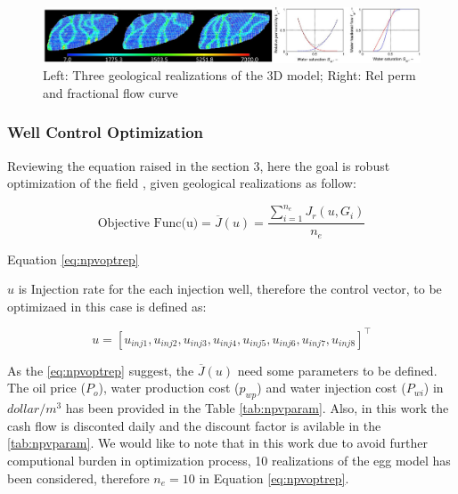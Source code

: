 \documentclass[]{elsarticle} %
\begin{document}
\begin{figure}

{\centering \includegraphics[width=1\linewidth]{img/combine} 

}

\caption{Left: Three geological realizations of the 3D model; Right: Rel perm and fractional flow curve}\label{fig:combine}
\end{figure}

\hypertarget{well-control-optimization}{%
\subsubsection{Well Control Optimization}\label{well-control-optimization}}

Reviewing the equation raised in the section 3, here the goal is robust optimization of the field , given geological realizations as follow:

\begin{equation}
\text{Objective Func(u)}= \overline{J}(u) = \frac{\sum_{i=1}^{n_e} J_r(u,G_i)}{n_e}  \label{eq:npvoptrep}
\end{equation}

Equation \eqref{eq:npvoptrep}

\(u\) is Injection rate for the each injection well, therefore the control vector, to be optimizaed in this case is defined as:

\begin{equation}
u=[u_{inj1},u_{inj2},u_{inj3},u_{inj4},u_{inj5},u_{inj6},u_{inj7},u_{inj8}]^{\intercal} 
\label{eq:cont-vec}
\end{equation}

As the \eqref{eq:npvoptrep} suggest, the \(\overline{J}(u)\) need some parameters to be defined. The oil price (\(P_o\)), water production cost (\(p_{wp}\)) and water injection cost (\(P_{wi}\)) in \(dollar/m^3\) has been provided in the Table \ref{tab:npvparam}. Also, in this work the cash flow is disconted daily and the discount factor is avilable in the \ref{tab:npvparam}. We would like to note that in this work due to avoid further computional burden in optimization process, 10 realizations of the egg model has been considered, therefore \(n_e=10\) in Equation \eqref{eq:npvoptrep}.
\end{document}
